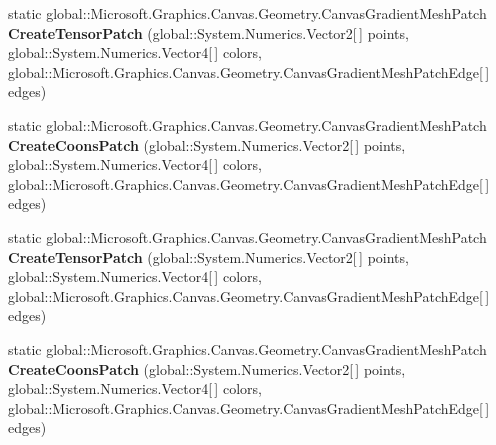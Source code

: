 \begin{DoxyCompactItemize}
static global\+::\+Microsoft.\+Graphics.\+Canvas.\+Geometry.\+Canvas\+Gradient\+Mesh\+Patch {\bfseries Create\+Tensor\+Patch} (global\+::\+System.\+Numerics.\+Vector2\mbox{[}$\,$\mbox{]} points, global\+::\+System.\+Numerics.\+Vector4\mbox{[}$\,$\mbox{]} colors, global\+::\+Microsoft.\+Graphics.\+Canvas.\+Geometry.\+Canvas\+Gradient\+Mesh\+Patch\+Edge\mbox{[}$\,$\mbox{]} edges)
\item 
\mbox{\label{class_microsoft_1_1_graphics_1_1_canvas_1_1_geometry_1_1_canvas_gradient_mesh_a1250e69d906353253b5c257cb7b7fb9f}} 
static global\+::\+Microsoft.\+Graphics.\+Canvas.\+Geometry.\+Canvas\+Gradient\+Mesh\+Patch {\bfseries Create\+Coons\+Patch} (global\+::\+System.\+Numerics.\+Vector2\mbox{[}$\,$\mbox{]} points, global\+::\+System.\+Numerics.\+Vector4\mbox{[}$\,$\mbox{]} colors, global\+::\+Microsoft.\+Graphics.\+Canvas.\+Geometry.\+Canvas\+Gradient\+Mesh\+Patch\+Edge\mbox{[}$\,$\mbox{]} edges)
\item 
\mbox{\label{class_microsoft_1_1_graphics_1_1_canvas_1_1_geometry_1_1_canvas_gradient_mesh_a354ddcec29b2b78440f0ed1529ae8d0d}} 
static global\+::\+Microsoft.\+Graphics.\+Canvas.\+Geometry.\+Canvas\+Gradient\+Mesh\+Patch {\bfseries Create\+Tensor\+Patch} (global\+::\+System.\+Numerics.\+Vector2\mbox{[}$\,$\mbox{]} points, global\+::\+System.\+Numerics.\+Vector4\mbox{[}$\,$\mbox{]} colors, global\+::\+Microsoft.\+Graphics.\+Canvas.\+Geometry.\+Canvas\+Gradient\+Mesh\+Patch\+Edge\mbox{[}$\,$\mbox{]} edges)
\item 
\mbox{\label{class_microsoft_1_1_graphics_1_1_canvas_1_1_geometry_1_1_canvas_gradient_mesh_a1250e69d906353253b5c257cb7b7fb9f}} 
static global\+::\+Microsoft.\+Graphics.\+Canvas.\+Geometry.\+Canvas\+Gradient\+Mesh\+Patch {\bfseries Create\+Coons\+Patch} (global\+::\+System.\+Numerics.\+Vector2\mbox{[}$\,$\mbox{]} points, global\+::\+System.\+Numerics.\+Vector4\mbox{[}$\,$\mbox{]} colors, global\+::\+Microsoft.\+Graphics.\+Canvas.\+Geometry.\+Canvas\+Gradient\+Mesh\+Patch\+Edge\mbox{[}$\,$\mbox{]} edges)
\item 
\mbox{\label{class_microsoft_1_1_graphics_1_1_canvas_1_1_geometry_1_1_canvas_gradient_mesh_a354ddcec29b2b78440f0ed1529ae8d0d}} 

\end{DoxyCompactItemize}
